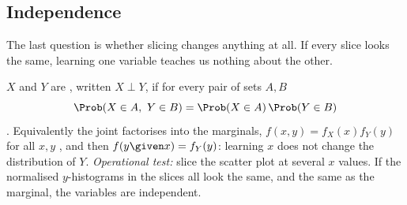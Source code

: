 \subsection{Independence}

The last question is whether slicing changes anything at all. If every slice
looks the same, learning one variable teaches us nothing about the other.

\begin{workdef}
$X$ and $Y$ are , written $X\perp Y$, if for every pair
of sets $A,B$
\[
  \Prob(X\in A,\ Y\in B)=\Prob(X\in A)\,\Prob(Y\in B)
\]
.
Equivalently the joint factorises into the marginals,
$f(x,y)=f_X(x)f_Y(y)$ for all $x,y$ , and then
$f(y\given x)=f_Y(y)$: learning $x$ does not change the distribution of $Y$.
\emph{Operational test:} slice the scatter plot at several $x$ values. If
the normalised $y$-histograms in the slices all look the same, and the same
as the marginal, the variables are independent.
\end{workdef}

